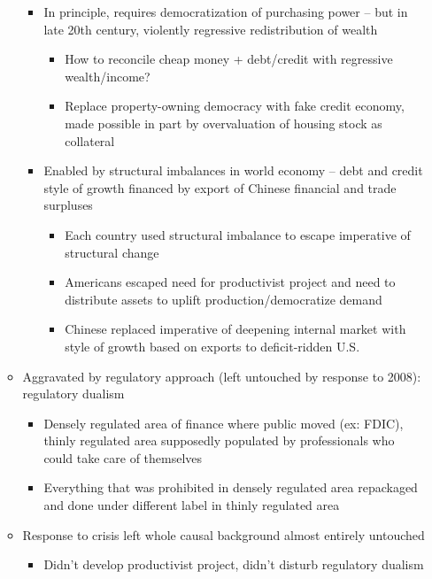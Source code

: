 \begin{itemize}
\begin{itemize}
    \begin{itemize}
    \tightlist
    \item
      In principle, requires democratization of purchasing power -- but
      in late 20th century, violently regressive redistribution of
      wealth

      \begin{itemize}
      \tightlist
      \item
        How to reconcile cheap money + debt/credit with regressive
        wealth/income?
      \item
        Replace property-owning democracy with fake credit economy, made
        possible in part by overvaluation of housing stock as collateral
      \end{itemize}
    \item
      Enabled by structural imbalances in world economy -- debt and
      credit style of growth financed by export of Chinese financial and
      trade surpluses

      \begin{itemize}
      \tightlist
      \item
        Each country used structural imbalance to escape imperative of
        structural change
      \item
        Americans escaped need for productivist project and need to
        distribute assets to uplift production/democratize demand
      \item
        Chinese replaced imperative of deepening internal market with
        style of growth based on exports to deficit-ridden U.S.
      \end{itemize}
    \end{itemize}
  \item
    Aggravated by regulatory approach (left untouched by response to
    2008): regulatory dualism

    \begin{itemize}
    \tightlist
    \item
      Densely regulated area of finance where public moved (ex: FDIC),
      thinly regulated area supposedly populated by professionals who
      could take care of themselves
    \item
      Everything that was prohibited in densely regulated area
      repackaged and done under different label in thinly regulated area
    \end{itemize}
  \item
    Response to crisis left whole causal background almost entirely
    untouched

    \begin{itemize}
    \tightlist
    \item
      Didn't develop productivist project, didn't disturb regulatory
      dualism
    \end{itemize}
  \end{itemize}
\end{itemize}

